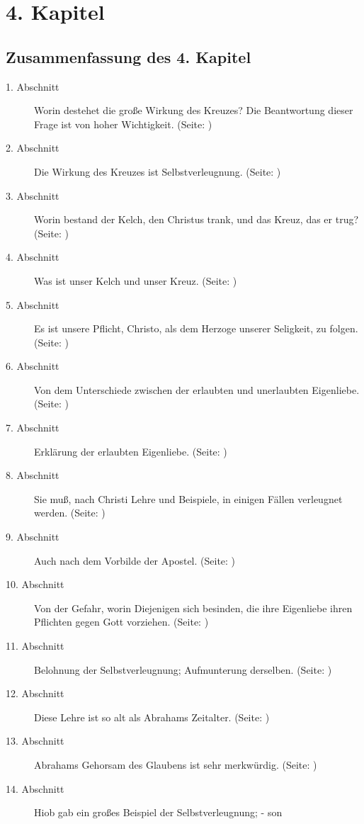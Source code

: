 
\chapter{4. Kapitel} \label{kap4}

\section{Zusammenfassung des 4. Kapitel}
\footnotesize
\begin{description}
\item[1. Abschnitt] Worin destehet die große Wirkung des Kreuzes? Die
Beantwortung dieser Frage ist von hoher Wichtigkeit.
(Seite: \pageref{kap4_ab1})
\item[2. Abschnitt] Die Wirkung des Kreuzes ist Selbstverleugnung.
(Seite: \pageref{kap4_ab2})
\item[3. Abschnitt] Worin bestand der Kelch, den Christus trank, und das Kreuz,
das er trug? (Seite: \pageref{kap4_ab3})
\item[4. Abschnitt]  Was ist unser Kelch und unser Kreuz. (Seite: \pageref{kap4_ab4})
\item[5. Abschnitt] Es ist unsere Pflicht, Christo, als dem Herzoge unserer
Seligkeit, zu folgen. (Seite: \pageref{kap4_ab5})
\item[6. Abschnitt] Von dem Unterschiede zwischen der erlaubten und unerlaubten
Eigenliebe. (Seite: \pageref{kap4_ab6})
\item[7. Abschnitt] Erklärung der erlaubten Eigenliebe. (Seite: \pageref{kap4_ab7})
\item[8. Abschnitt] Sie muß, nach Christi Lehre und Beispiele, in einigen Fällen
verleugnet werden. (Seite: \pageref{kap4_ab8})
\item[9. Abschnitt] Auch nach dem Vorbilde der Apostel. (Seite: \pageref{kap4_ab9})
\item[10. Abschnitt] Von der Gefahr, worin Diejenigen sich besinden, die ihre
Eigenliebe ihren Pflichten gegen Gott vorziehen. (Seite: \pageref{kap4_ab10})
\item[11. Abschnitt] Belohnung der Selbstverleugnung; Aufmunterung derselben. (Seite: \pageref{kap4_ab11})
\item[12. Abschnitt] Diese Lehre ist so alt als Abrahams Zeitalter. (Seite: \pageref{kap4_ab12})
\item[13. Abschnitt] Abrahams Gehorsam des Glaubens ist sehr merkwürdig. (Seite: \pageref{kap4_ab13})
\item[14. Abschnitt] Hiob gab ein großes Beispiel der Selbstverleugnung; - son

\end{description}
